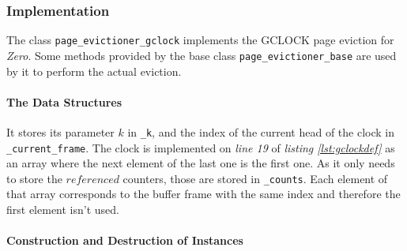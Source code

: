 \subsubsection{Implementation}

    The class \lstinline{page_evictioner_gclock} implements the GCLOCK page eviction for \emph{Zero}. Some methods provided by the base class \lstinline{page_evictioner_base} are used by it to perform the actual eviction.

\paragraph{The Data Structures}

\begin{@empty}
    \lstset{
        language = [ISO]C++,
        style = basic
    }
    \begin{code}[ht!]
        \caption{Data Structures of the Class \lstinline{page_evictioner_gclock}} \label{lst:gclockdef}
        
    \end{code}
\end{@empty}

    It stores its parameter $k$ in \lstinline{_k}, and the index of the current head of the clock in \lstinline{_current_frame}. The clock is implemented on \emph{line 19} of \emph{listing \ref{lst:gclockdef}} as an array where the next element of the last one is the first one. As it only needs to store the $referenced$ counters, those are stored in \lstinline{_counts}. Each element of that array corresponds to the buffer frame with the same index and therefore the first element isn't used.

\paragraph{Construction and Destruction of Instances}

\begin{@empty}
    \lstset{
        language = [ISO]C++,
        style = basic
    }
    \begin{code}[ht!]
        \caption{Constructor and Destructor of the Class \lstinline{page_evictioner_gclock}} \label{lst:gclockconstructor}
        
    \end{code}
\end{@empty}

